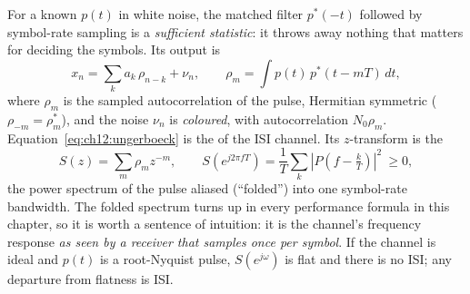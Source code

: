 For a known $p(t)$ in white noise, the matched filter $p^*(-t)$ followed by symbol-rate sampling
is a \emph{sufficient statistic}: it throws away nothing that matters for deciding the symbols.
Its output is
\begin{equation}
x_n=\sum_k a_k\,\rho_{n-k}+\nu_n,\qquad \rho_m=\int p(t)\,p^*(t-mT)\,dt ,
\label{eq:ch12:ungerboeck}
\end{equation}
where $\rho_m$ is the sampled autocorrelation of the pulse, Hermitian symmetric
($\rho_{-m}=\rho_m^*$), and the noise $\nu_n$ is \emph{coloured}, with autocorrelation
$N_0\rho_m$. Equation~\eqref{eq:ch12:ungerboeck} is the  of the ISI
channel. Its $z$-transform is the 
\begin{equation}
S(z)=\sum_m \rho_m z^{-m},\qquad
S(e^{j2\pi fT})=\frac1T\sum_k\left|P\!\left(f-\tfrac kT\right)\right|^2\ \ge 0,
\label{eq:ch12:folded}
\end{equation}
the power spectrum of the pulse aliased (``folded'') into one symbol-rate bandwidth. The folded
spectrum turns up in every performance formula in this chapter, so it is worth a sentence of
intuition: it is the channel's frequency response \emph{as seen by a receiver that samples once per
symbol}. If the channel is ideal and $p(t)$ is a root-Nyquist pulse, $S(e^{j\omega})$ is flat and
there is no ISI; any departure from flatness is ISI.

